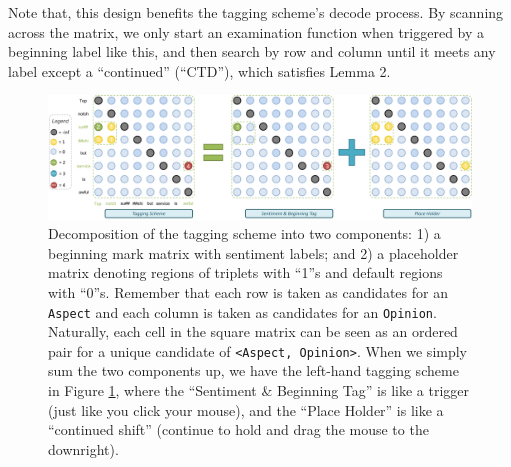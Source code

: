 \documentclass[11pt]{article}
\begin{document}
Note that, this design benefits the tagging scheme's decode process. By scanning across the matrix, we only start an examination function when triggered by a beginning label like this, and then search by row and column until it meets any label except a ``continued'' (``CTD''), which satisfies Lemma 2.

\begin{figure}[!ht]
\begin{center}
\includegraphics[scale=0.38]{fig_expln_grid.pdf} 
\caption{Decomposition of the tagging scheme into two components: 1) a beginning mark matrix with sentiment labels; and 2) a placeholder matrix denoting regions of triplets with ``1''s and default regions with ``0''s. Remember that each row is taken as candidates for an \texttt{Aspect} and each column is taken as candidates for an \texttt{Opinion}. Naturally, each cell in the square matrix can be seen as an ordered pair for a unique candidate of \texttt{<Aspect, Opinion>}. When we simply sum the two components up, we have the left-hand tagging scheme in Figure \ref{fig.tagging}, where the ``Sentiment \& Beginning Tag'' is like a trigger (just like you click your mouse), and the ``Place Holder'' is like a ``continued shift'' (continue to hold and drag the mouse to the downright).}
\label{fig.tagging}
\end{center}
\end{figure}



\end{document}
